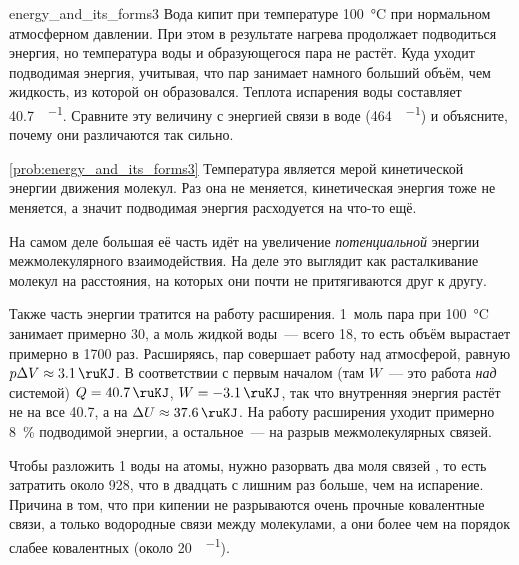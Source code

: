 \begin{problem}{}{energy_and_its_forms3}
    Вода кипит при температуре \qty{100}{\degreeCelsius} при нормальном атмосферном давлении. При этом в результате нагрева продолжает подводиться энергия, но температура воды и образующегося пара не растёт. Куда уходит подводимая энергия, учитывая, что пар занимает намного больший объём, чем жидкость, из которой он образовался. Теплота испарения воды составляет \qty{40,7}{\ruKJ\per\ruMole}. Сравните эту величину с энергией связи  в воде (\qty{464}{\ruKJ\per\ruMole}) и объясните, почему они различаются так сильно.
    \begin{sol}{\ref{prob:energy_and_its_forms3}}
        Температура является мерой кинетической энергии движения молекул. Раз она не меняется, кинетическая энергия тоже не меняется, а значит подводимая энергия расходуется на что-то ещё.

        На самом деле большая её часть идёт на увеличение \emph{потенциальной} энергии межмолекулярного взаимодействия. На деле это выглядит как расталкивание молекул на расстояния, на которых они почти не притягиваются друг к другу.

        Также часть энергии тратится на работу расширения. 1~моль пара при \qty{100}{\degreeCelsius} занимает примерно \qty{30}{\ruL}, а моль жидкой воды~--- всего \qty{18}{\ruMl}, то есть объём вырастает примерно в \num{1700} раз. Расширяясь, пар совершает работу над атмосферой, равную $p \Delta V \approx \qty{3,1}{\ruKJ}$. В соответствии с первым началом (там $W$~--- это работа \emph{над} системой) $Q = \qty{40,7}{\ruKJ}$, $W = \qty{-3,1}{\ruKJ}$, так что внутренняя энергия растёт не на все \num{40,7}, а на $\Delta U \approx \qty{37,6}{\ruKJ}$. На работу расширения уходит примерно \qty{8}{\percent} подводимой энергии, а остальное~--- на разрыв межмолекулярных связей.

        Чтобы разложить \qty{1}{\ruMole} воды на атомы, нужно разорвать два моля связей , то есть затратить около \qty{928}{\ruKJ}, что в двадцать с лишним раз больше, чем на испарение. Причина в том, что при кипении не разрываются очень прочные ковалентные связи, а только водородные связи между молекулами, а они более чем на порядок слабее ковалентных (около \qty{20}{\ruKJ\per\ruMole}).
    \end{sol}
\end{problem}


